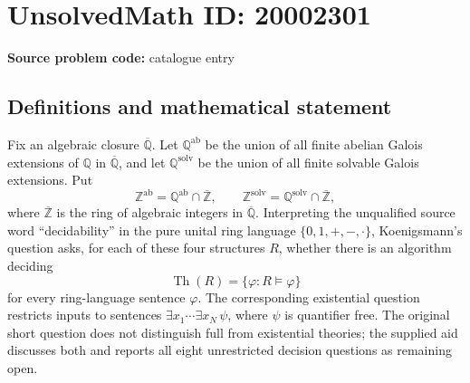 \documentclass[11pt]{article}
\newcommand{\Z}{\mathbb{Z}}
\newcommand{\Q}{\mathbb{Q}}
\begin{document}
\section*{UnsolvedMath ID: 20002301}
\textbf{Source problem code:} catalogue entry
\subsection{Definitions and mathematical statement}
Fix an algebraic closure \(\overline{\Q}\). Let \(\Q^{\mathrm{ab}}\) be the union of all finite abelian Galois extensions of \(\Q\) in \(\overline{\Q}\), and let \(\Q^{\mathrm{solv}}\) be the union of all finite solvable Galois extensions. Put
\[
 \Z^{\mathrm{ab}}=\Q^{\mathrm{ab}}\cap\overline{\Z},\qquad
 \Z^{\mathrm{solv}}=\Q^{\mathrm{solv}}\cap\overline{\Z},
\]
where \(\overline{\Z}\) is the ring of algebraic integers in \(\overline{\Q}\). Interpreting the unqualified source word ``decidability'' in the pure unital ring language \(\{0,1,+,-,\cdot\}\), Koenigsmann's question asks, for each of these four structures \(R\), whether there is an algorithm deciding
\[
 \operatorname{Th}(R)=\{\varphi:R\models\varphi\}
\]
for every ring-language sentence \(\varphi\). The corresponding existential question restricts inputs to sentences \(\exists x_1\cdots\exists x_N\,\psi\), where \(\psi\) is quantifier free. The original short question does not distinguish full from existential theories; the supplied aid discusses both and reports all eight unrestricted decision questions as remaining open.
\end{document}
